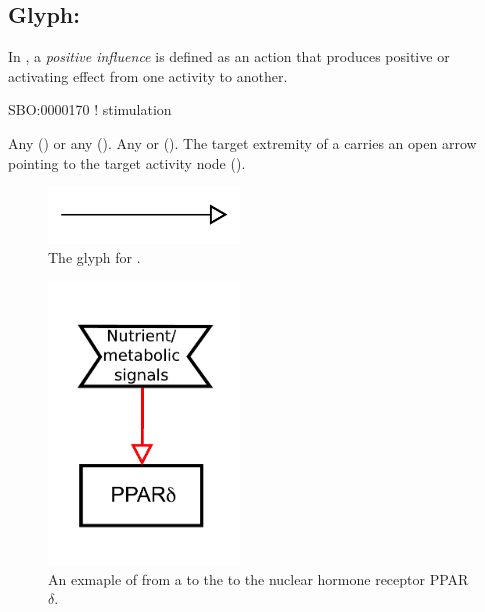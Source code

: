\subsection{Glyph: }
\label{sec:af:positive_infl}

In \SBGNAFLone, a \emph{positive influence} is defined as an action that produces positive or activating effect from one activity to another.   

\begin{glyphDescription}

\glyphSboTerm SBO:0000170 ! stimulation

 \glyphOrigin Any  () or any  ().
 \glyphTarget Any  or  ().
 \glyphEndPoint The target extremity of a  carries an open arrow pointing to the target activity node ().


\end{glyphDescription}

\begin{figure}[H]
  \centering
  \includegraphics[width = 2in]{images/positiveInfluence}
  \caption{The \AF glyph for .}
  \label{fig:af:positiveInfl}
\end{figure}


\begin{figure}[H]
  \centering
  \includegraphics[width = 2in]{examples/ex-positiveInfluence}
  \caption{An exmaple of  from a  to the to the nuclear hormone receptor PPAR$\delta$.}
  \label{fig:af:exPI}
\end{figure}